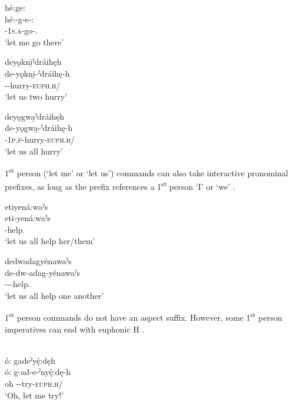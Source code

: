 \ea\label{ex:commandex7} {}
\ea hé:ge: \\
\gll hé:-g-e-:\\
{\translocative}-\textsc{1s.a}-go-{\purposive.{\noaspect}}\\
\glt ‘let me go there’ 


\ex deyǫkni̱ˀdráihęh\\
\gll de-yǫkni̱-ˀdráihę-h\\
 {\dualic}--hurry-\textsc{euph.h}/{\noaspect}\\
\glt `let us two hurry'

\ex deyǫgwa̱ˀdráihęh\\
\gll de-yǫgwa̱-ˀdráihę-h\\
{\dualic}-\textsc{1p.p}-hurry-\textsc{euph.h}/{\noaspect}\\
\glt ‘let us all hurry’
\z
\z

1\textsuperscript{st} person (‘let me’ or ‘let us’) commands can also take interactive pronominal prefixes, as long as the prefix references a 1\textsuperscript{st} person ‘I’ or ‘we’ .

\ea\label{ex:commandex9} {}
\ea etiyená:waˀs\\
\gll eti-yená:waˀs\\
 -help.{\noaspect}\\
\glt `let us all help her/them'

\ex dedwadagyénawaˀs\\
\gll de-dw-adag-yénawaˀs\\
 {\dualic}--{}-help.{\noaspect}\\
\glt `let us all help one another'
\z
\z


1\textsuperscript{st} person commands do not have an aspect suffix. However, some 1\textsuperscript{st} person imperatives can end with euphonic H . 

\newpage
\ea\label{ex:commandex12} {}\\
ó: gadeˀyę́:dęh  \\
\gll ó: g-ad-e-ˀnyę́:dę-h\\
 oh -{\joinerE}-try-\textsc{euph.h}/{\noaspect} \\
\glt ‘Oh, let me try!’

\z



